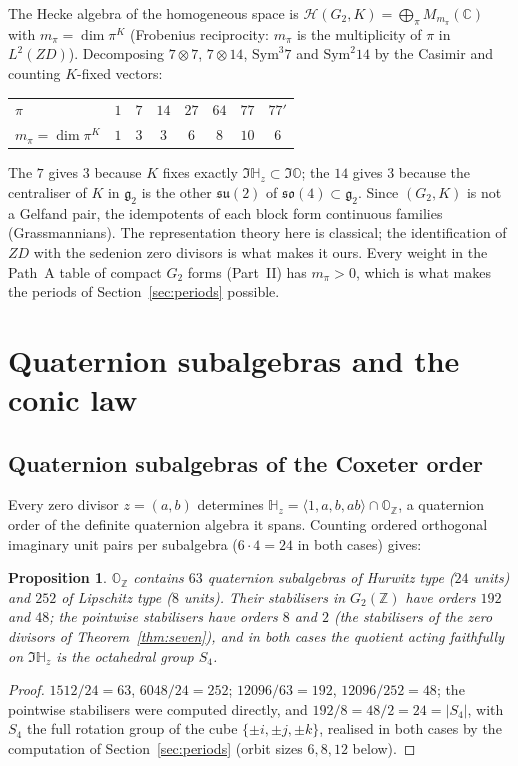\documentclass[11pt]{amsart}
\newtheorem{proposition}[theorem]{Proposition}
\theoremstyle{definition}
\renewcommand{\O}{\mathbb{O}}\newcommand{\Sd}{\mathbb{S}}\newcommand{\Hq}{\mathbb{H}}\newcommand{\Z}{\mathbb{Z}}\newcommand{\Q}{\mathbb{Q}}\newcommand{\R}{\mathbb{R}}\newcommand{\C}{\mathbb{C}}\newcommand{\F}{\mathbb{F}}
\begin{document}
The Hecke algebra of the homogeneous space is $\mathcal H(G_2,K)=\bigoplus_\pi M_{m_\pi}(\C)$ with $m_\pi=\dim\pi^K$ (Frobenius reciprocity: $m_\pi$ is the multiplicity of $\pi$ in $L^2(ZD)$). Decomposing $7\otimes 7$, $7\otimes 14$, $\mathrm{Sym}^3 7$ and $\mathrm{Sym}^2 14$ by the Casimir and counting $K$-fixed vectors:
\begin{center}
\begin{tabular}{l@{\quad}ccccccc}\toprule
$\pi$ & $1$ & $7$ & $14$ & $27$ & $64$ & $77$ & $77'$\\
$m_\pi=\dim\pi^K$ & $1$ & $3$ & $3$ & $6$ & $8$ & $10$ & $6$\\\bottomrule
\end{tabular}
\end{center}
The $7$ gives $3$ because $K$ fixes exactly $\Im\Hq_z\subset\Im\O$; the $14$ gives $3$ because the centraliser of $K$ in $\mathfrak g_2$ is the other $\mathfrak{su}(2)$ of $\mathfrak{so}(4)\subset\mathfrak g_2$. Since $(G_2,K)$ is not a Gelfand pair, the idempotents of each block form continuous families (Grassmannians). The representation theory here is classical; the identification of $ZD$ with the sedenion zero divisors is what makes it ours. Every weight in the Path~A table of compact $G_2$ forms (Part~II) has $m_\pi>0$, which is what makes the periods of Section~\ref{sec:periods} possible.

\section{Quaternion subalgebras and the conic law}\label{sec:conic}
\subsection{Quaternion subalgebras of the Coxeter order}
Every zero divisor $z=(a,b)$ determines $\Hq_z=\langle 1,a,b,ab\rangle\cap\O_\Z$, a quaternion order of the definite quaternion algebra it spans. Counting ordered orthogonal imaginary unit pairs per subalgebra ($6\cdot 4=24$ in both cases) gives:
\begin{proposition}\label{prop:count}
$\O_\Z$ contains $63$ quaternion subalgebras of Hurwitz type ($24$ units) and $252$ of Lipschitz type ($8$ units). Their stabilisers in $G_2(\Z)$ have orders $192$ and $48$; the pointwise stabilisers have orders $8$ and $2$ (the stabilisers of the zero divisors of Theorem~\ref{thm:seven}), and in both cases the quotient acting faithfully on $\Im\Hq_z$ is the octahedral group $S_4$.
\end{proposition}
\begin{proof}
$1512/24=63$, $6048/24=252$; $12096/63=192$, $12096/252=48$; the pointwise stabilisers were computed directly, and $192/8=48/2=24=|S_4|$, with $S_4$ the full rotation group of the cube $\{\pm i,\pm j,\pm k\}$, realised in both cases by the computation of Section~\ref{sec:periods} (orbit sizes $6,8,12$ below).
\end{proof}
\end{document}

